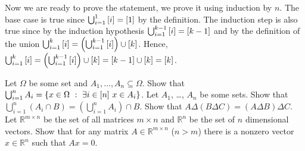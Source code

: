 \begin{chapterendexercises}
\begin{solution}
        Now we are ready to prove the statement, we prove it using induction by
        $n$. The base case is true since $\bigcup_{i = 1}^1 {[{i}]} =
        {[{1}]}$ by the definition. The induction step is also true since by
        the induction hypothesis $\bigcup_{i = 1}^{k - 1} {[{i}]} = 
        {[{k - 1}]}$ and by the definition of the union 
        $\bigcup_{i = 1}^k {[{i}]} = 
        \left(\bigcup_{i = 1}^{k - 1} {[{i}]}\right) \cup {[{k}]}$.
        Hence, $\bigcup_{i = 1}^k {[{i}]} = 
          \left( \bigcup_{i = 1}^{k - 1} {[{i}]} \right) \cup {[{k}]} = 
          {[{k - 1}]} \cup {[{k}]} = {[{k}]}$.
      \end{solution}
  \exercise[recommended] Let $\Omega$ be some set and $A_1, \dots, A_n \subseteq \Omega$.
    Show that $\bigcup_{i = 1}^n A_i =
      \set[{\exists i \in \range{n}\ x \in A_i}]{x \in \Omega}$.
  \exercise Let $A_1$, \dots, $A_n$ be some sets.
    Show that $\bigcup_{i = 1}^n (A_i \cap B) =
    \left(\bigcup_{i = 1}^n A_i\right) \cap B$.
  \exercise Show that $A \Delta (B \Delta C) = (A \Delta B) \Delta C$.
  \exercise[recommended]
    Let $\mathbb{R}^{m \times n}$ be the set of all matrices $m \times n$ and
    $\mathbb{R}^n$ be the set of $n$ dimensional vectors.
    Show that for any matrix $A \in \mathbb{R}^{m \times n}$
    ($n > m$) there is a nonzero vector $x \in \mathbb{R}^n$ such that $Ax = 0$.
\end{chapterendexercises}
